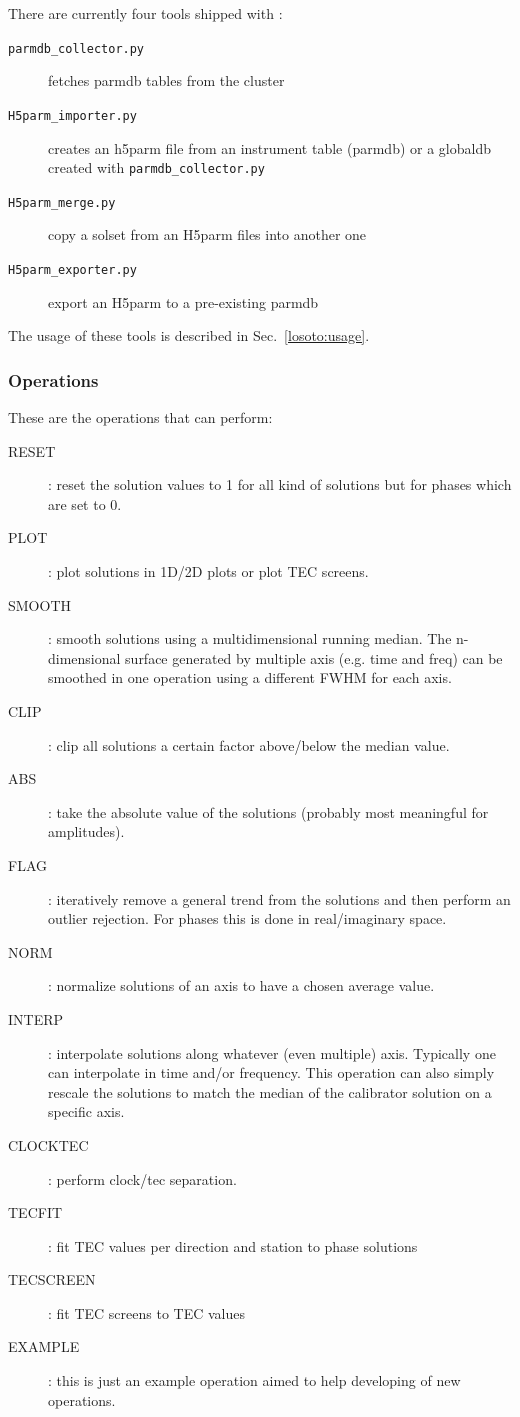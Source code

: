 \documentclass[]{article}
\begin{document}
There are currently four tools shipped with \losoto{}:
\begin{description}
 \item[\texttt{parmdb\_collector.py}] fetches parmdb tables from the cluster
 \item[\texttt{H5parm\_importer.py}] creates an h5parm file from an instrument table (parmdb) or a globaldb created with \texttt{parmdb\_collector.py}
 \item[\texttt{H5parm\_merge.py}] copy a solset from an H5parm files into another one
 \item[\texttt{H5parm\_exporter.py}] export an H5parm to a pre-existing parmdb
\end{description}

The usage of these tools is described in Sec.~\ref{losoto:usage}.

\subsubsection{Operations}
\label{losoto:operations}

These are the operations that \losoto{} can perform:
\begin{description}
 \item[RESET]: reset the solution values to 1 for all kind of solutions but for phases which are set to 0.
 \item[PLOT]: plot solutions in 1D/2D plots or plot TEC screens.
 \item[SMOOTH]: smooth solutions using a multidimensional running median. The n-dimensional surface generated by multiple axis (e.g. time and freq) can be smoothed in one operation using a different FWHM for each axis.
 \item[CLIP]: clip all solutions a certain factor above/below the median value.
 \item[ABS]: take the absolute value of the solutions (probably most meaningful for amplitudes).
 \item[FLAG]: iteratively remove a general trend from the solutions and then perform an outlier rejection. For phases this is done in real/imaginary space.
 \item[NORM]: normalize solutions of an axis to have a chosen average value.
 \item[INTERP]: interpolate solutions along whatever (even multiple) axis. Typically one can interpolate in time and/or frequency. This operation can also simply rescale the solutions to match the median of the calibrator solution on a specific axis.
 \item[CLOCKTEC]: perform clock/tec separation.
 \item[TECFIT]: fit TEC values per direction and station to phase solutions
 \item[TECSCREEN]: fit TEC screens to TEC values
 \item[EXAMPLE]: this is just an example operation aimed to help developing of new operations.
\end{description}
\end{document}
